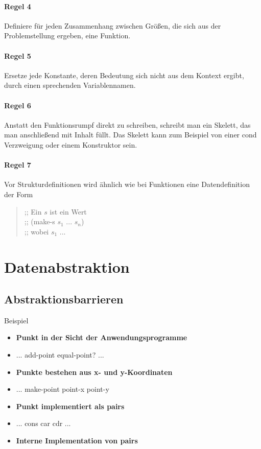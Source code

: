 \documentclass[../main.tex]{subfiles}
\begin{document}
        \paragraph{Regel 4}
            Definiere für jeden Zusammenhang zwischen Größen, die sich aus der Problemstellung ergeben, eine Funktion.
            
        \paragraph{Regel 5}
            Ersetze jede Konstante, deren Bedeutung sich nicht aus dem Kontext ergibt, durch einen sprechenden Variablennamen.
            
        \paragraph{Regel 6}
            Anstatt den Funktionsrumpf direkt zu schreiben, schreibt man ein Skelett, das man anschließend mit Inhalt füllt. Das Skelett kann zum Beispiel von einer cond Verzweigung oder einem Konstruktor sein.
            
        \paragraph{Regel 7}
            Vor Strukturdefinitionen wird ähnlich wie bei Funktionen eine Datendefinition der Form
            
            \begin{quote}
                ;; Ein $s$ ist ein Wert\\
                ;; (make-s $s_1$ ... $s_n$)\\
                ;; wobei $s_1$ ...
            \end{quote}
            
    \section{Datenabstraktion}
        \subsection{Abstraktionsbarrieren}
            Beispiel 
            
            \begin{itemize}
                \item \textbf{Punkt in der Sicht der Anwendungsprogramme}
                \item ... add-point equal-point? ...
                \item \textbf{Punkte bestehen aus x- und y-Koordinaten}
                \item ... make-point point-x point-y
                \item \textbf{Punkt implementiert als pairs}
                \item ... cons car cdr ...
                \item \textbf{Interne Implementation von pairs}
            \end{itemize}
        
\end{document}
